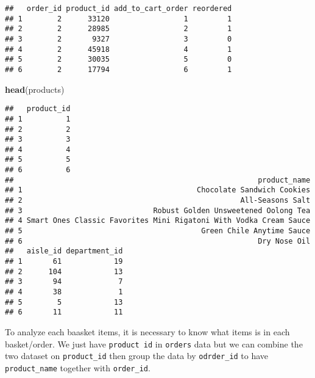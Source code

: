 \documentclass[]{article}
\newenvironment{Shaded}{\begin{snugshade}}{\end{snugshade}}
\newcommand{\CommentTok}[1]{\textcolor[rgb]{0.56,0.35,0.01}{\textit{#1}}}
\newcommand{\DataTypeTok}[1]{\textcolor[rgb]{0.13,0.29,0.53}{#1}}
\newcommand{\KeywordTok}[1]{\textcolor[rgb]{0.13,0.29,0.53}{\textbf{#1}}}
\newcommand{\NormalTok}[1]{#1}
\newcommand{\OperatorTok}[1]{\textcolor[rgb]{0.81,0.36,0.00}{\textbf{#1}}}
\newcommand{\StringTok}[1]{\textcolor[rgb]{0.31,0.60,0.02}{#1}}
\begin{document}
\begin{verbatim}
##   order_id product_id add_to_cart_order reordered
## 1        2      33120                 1         1
## 2        2      28985                 2         1
## 3        2       9327                 3         0
## 4        2      45918                 4         1
## 5        2      30035                 5         0
## 6        2      17794                 6         1
\end{verbatim}

\begin{Shaded}
\begin{Highlighting}[]
\KeywordTok{head}\NormalTok{(products)}
\end{Highlighting}
\end{Shaded}

\begin{verbatim}
##   product_id
## 1          1
## 2          2
## 3          3
## 4          4
## 5          5
## 6          6
##                                                        product_name
## 1                                        Chocolate Sandwich Cookies
## 2                                                  All-Seasons Salt
## 3                              Robust Golden Unsweetened Oolong Tea
## 4 Smart Ones Classic Favorites Mini Rigatoni With Vodka Cream Sauce
## 5                                         Green Chile Anytime Sauce
## 6                                                      Dry Nose Oil
##   aisle_id department_id
## 1       61            19
## 2      104            13
## 3       94             7
## 4       38             1
## 5        5            13
## 6       11            11
\end{verbatim}

To analyze each baasket items, it is necessary to know what items is in
each basket/order. We just have \texttt{product\ id} in \texttt{orders}
data but we can combine the two dataset on \texttt{product\_id} then
group the data by \texttt{odrder\_id} to have \texttt{product\_name}
together with \texttt{order\_id}.

\begin{Shaded}
\end{Shaded}
\end{document}
